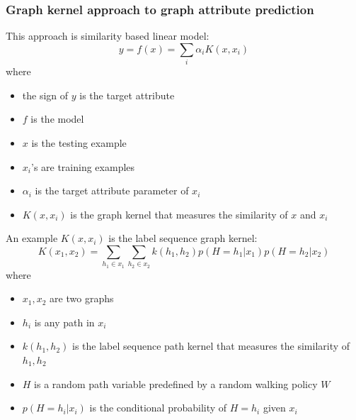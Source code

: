 \documentclass{article}
\begin{document}
\subsubsection{Graph kernel approach to graph attribute prediction}
This approach is similarity based linear model:
\[ y = f(x) = \sum_{i} \alpha_i K(x, x_i) \]
where 
\begin{itemize}
	\item the sign of $ y $ is the target attribute
	\item $ f $ is the model
	\item $ x $ is the testing example
	\item $ x_i $'s are training examples
	\item $ \alpha_i $ is the target attribute parameter of $ x_i $
	\item $ K(x, x_i) $ is the graph kernel
	that measures the similarity of $ x $ and $ x_i $
\end{itemize}
An example $ K(x, x_i) $ is the label sequence graph kernel:
\[ K(x_1, x_2) =
\sum_{h_1 \in x_1} \sum_{h_2 \in x_2} 
k(h_1, h_2) p(H = h_1 | x_1) p(H = h_2 | x_2) \]
where
\begin{itemize}
	\item $ x_1, x_2 $ are two graphs
	\item $ h_i $ is any path in $ x_i $
	\item $ k(h_1, h_2) $ is the label sequence path kernel
	that measures the similarity of $ h_1, h_2 $
	\item $ H $ is a random path variable predefined by a random walking policy $ W $
	\item $ p(H = h_i | x_i) $ is the conditional probability of $ H = h_i $ given $ x_i $
\end{itemize}
\end{document}
